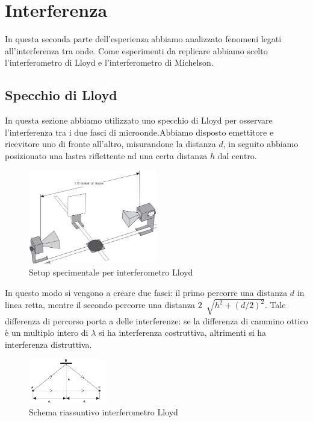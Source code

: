 \documentclass[letterpaper,12pt]{article}
\begin{document}
\newpage
\section{Interferenza}
In questa seconda parte dell'esperienza abbiamo analizzato fenomeni legati all'interferenza tra onde. Come esperimenti da replicare 
abbiamo scelto l'interferometro di Lloyd e l'interferometro di Michelson.\\

\subsection{Specchio di Lloyd}
In questa sezione abbiamo utilizzato uno specchio di Lloyd per osservare l'interferenza tra i due fasci 
di microonde.Abbiamo disposto emettitore e ricevitore uno di fronte all'altro, misurandone la distanza $d$, 
in seguito abbiamo posizionato una lastra riflettente ad una certa distanza $h$ dal centro. \\
\begin{figure}[h!]
	\centering
	\includegraphics[width = 0.5\textwidth]{LloydSetup.png}
	\caption{Setup sperimentale per interferometro Lloyd}
	\label{fig:setupLloyd}
\end{figure}

In questo modo si vengono a creare due fasci: il primo percorre una distanza $d$ in linea retta, mentre il secondo
percorre una distanza $2\ \sqrt[]{h^2 + (d/2)^2}$. Tale differenza di percorso porta a delle interferenze:
se la differenza di cammino ottico è un multiplo intero di $\lambda$ si ha interferenza costruttiva,
altrimenti si ha interferenza distruttiva.\\
\begin{figure}[h!]
	\centering
	\includegraphics[width = 0.3\textwidth]{SchemaLloyd.png}
	\caption{Schema riassuntivo interferometro Lloyd}
	\label{fig:schemaLloyd}
\end{figure}
\end{document}
